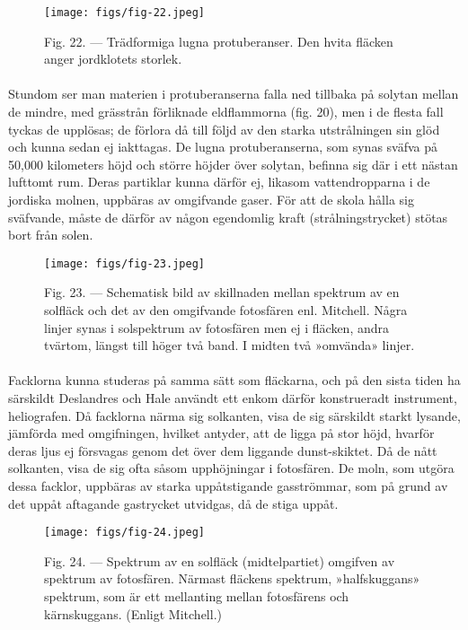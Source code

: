 \documentclass[a4paper, 12pt, oneside, swedish]{article}
\begin{document}
\begin{figure}[H]
\centering
\texttt{[image: figs/fig-22.jpeg]}
\caption{Fig. 22. --- Trädformiga lugna protuberanser. Den hvita fläcken anger jordklotets storlek.}
\end{figure}
\paragraph{}
Stundom ser man materien i protuberanserna falla ned tillbaka på solytan mellan de mindre, med grässtrån förliknade eldflammorna (fig. 20), men i de flesta fall tyckas de upplösas; de förlora då till följd av den starka utstrålningen sin glöd och kunna sedan ej iakttagas. De lugna protuberanserna, som synas sväfva på 50,000 kilometers höjd och större höjder över solytan, befinna sig där i ett nästan lufttomt rum. Deras partiklar kunna därför ej, likasom vattendropparna i de jordiska molnen, uppbäras av omgifvande gaser. För att de skola hålla sig sväfvande, måste de därför av någon egendomlig kraft (strålningstrycket) stötas bort från solen.

\begin{figure}[H]
\centering
\texttt{[image: figs/fig-23.jpeg]}
\caption{Fig. 23. --- Schematisk bild av skillnaden mellan spektrum av en solfläck och det av den omgifvande fotosfären enl. Mitchell. Några linjer synas i solspektrum av fotosfären men ej i fläcken, andra tvärtom, längst till höger två band. I midten två »omvända» linjer.}
\end{figure}
\paragraph{}
Facklorna kunna studeras på samma sätt som fläckarna, och på den sista tiden ha särskildt Deslandres och Hale användt ett enkom därför konstrueradt instrument, heliografen. Då facklorna närma sig solkanten, visa de sig särskildt starkt lysande, jämförda med omgifningen, hvilket antyder, att de ligga på stor höjd, hvarför deras ljus ej försvagas genom det över dem liggande dunst-skiktet. Då de nått solkanten, visa de sig ofta såsom upphöjningar i fotosfären. De moln, som utgöra dessa facklor, uppbäras av starka uppåtstigande gasströmmar, som på grund av det uppåt aftagande gastrycket utvidgas, då de stiga uppåt.

\begin{figure}[H]
\centering
\texttt{[image: figs/fig-24.jpeg]}
\caption{Fig. 24. --- Spektrum av en solfläck (midtelpartiet) omgifven av spektrum av fotosfären. Närmast fläckens spektrum, »halfskuggans» spektrum, som är ett mellanting mellan fotosfärens och kärnskuggans. (Enligt Mitchell.)}
\end{figure}
\end{document}
